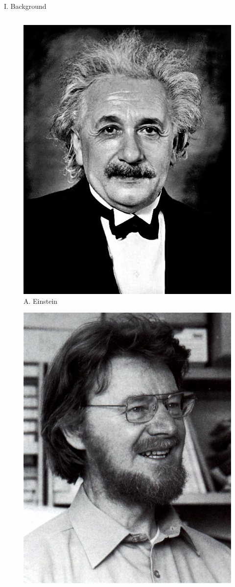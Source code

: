 \documentclass[final,hyperref={pdfpagelabels=false}]{beamer}
\begin{document}
\begin{frame}[t]
\begin{columns}[c]
\begin{column}{.31\textwidth}
\begin{block}{I. Background}
\begin{columns}
          \begin{column}{0.3\textwidth}
            \begin{figure}
              \includegraphics[width=0.8\linewidth]{einstein}
              \caption{A. Einstein}
            \end{figure}
            \begin{figure}
              \includegraphics[width=0.8\linewidth]{bell}

\end{figure}
\end{column}
\end{columns}
\end{block}
\end{column}
\end{columns}
\end{frame}
\end{document}
